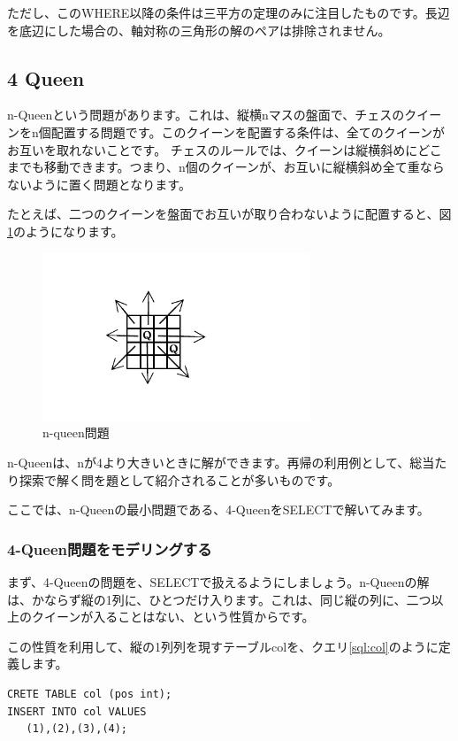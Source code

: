 ただし、このWHERE以降の条件は三平方の定理のみに注目したものです。長辺を底辺にした場合の、軸対称の三角形の解のペアは排除されません。


\subsection{4 Queen}

n-Queenという問題があります。これは、縦横nマスの盤面で、チェスのクイーンをn個配置する問題です。このクイーンを配置する条件は、全てのクイーンがお互いを取れないことです。
チェスのルールでは、クイーンは縦横斜めにどこまでも移動できます。つまり、n個のクイーンが、お互いに縦横斜め全て重ならないように置く問題となります。

たとえば、二つのクイーンを盤面でお互いが取り合わないように配置すると、図\ref{fig:n-queen}のようになります。

\begin{figure}[htbp]
  \includegraphics[width=8cm,pagebox=cropbox]{draw/4queen-0.pdf}
  \caption{n-queen問題}
  \label{fig:n-queen}
\end{figure}


n-Queenは、nが4より大きいときに解ができます。再帰の利用例として、総当たり探索で解く問を題として紹介されることが多いものです。

ここでは、n-Queenの最小問題である、4-QueenをSELECTで解いてみます。

\subsubsection{4-Queen問題をモデリングする}

まず、4-Queenの問題を、SELECTで扱えるようにしましょう。n-Queenの解は、かならず縦の1列に、ひとつだけ入ります。これは、同じ縦の列に、二つ以上のクイーンが入ることはない、という性質からです。

この性質を利用して、縦の1列列を現すテーブルcolを、クエリ\ref{sql:col}のように定義します。

\begin{lstlisting}[caption=縦の列を定義するテーブル,label=sql:col]
CRETE TABLE col (pos int);
INSERT INTO col VALUES
   (1),(2),(3),(4);
\end{lstlisting}

